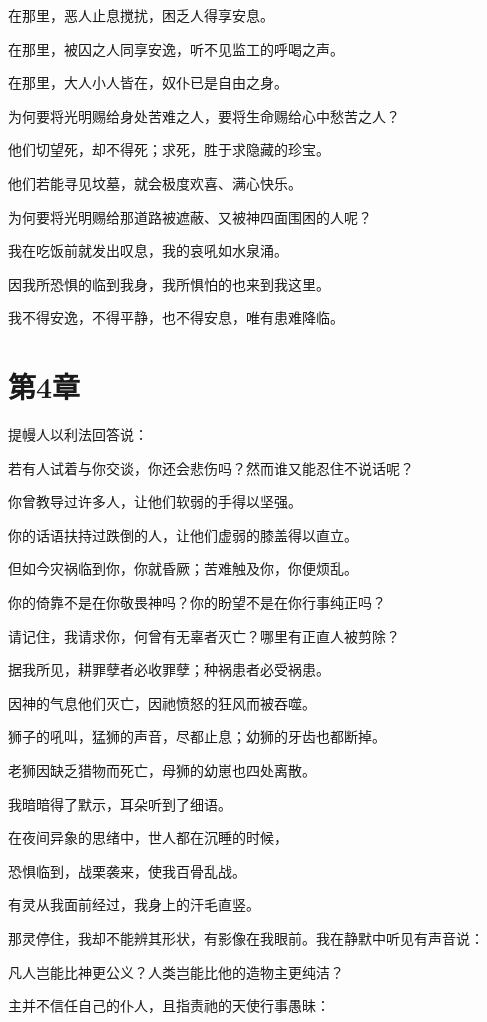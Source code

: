 \documentclass[12pt,oneside]{book}
\begin{document}
在那里，恶人止息搅扰，困乏人得享安息。

在那里，被囚之人同享安逸，听不见监工的呼喝之声。

在那里，大人小人皆在，奴仆已是自由之身。

为何要将光明赐给身处苦难之人，要将生命赐给心中愁苦之人？

他们切望死，却不得死；求死，胜于求隐藏的珍宝。

他们若能寻见坟墓，就会极度欢喜、满心快乐。

为何要将光明赐给那道路被遮蔽、又被神四面围困的人呢？

我在吃饭前就发出叹息，我的哀吼如水泉涌。

因我所恐惧的临到我身，我所惧怕的也来到我这里。

我不得安逸，不得平静，也不得安息，唯有患难降临。


\chapter{第4章}
提幔人以利法回答说：

若有人试着与你交谈，你还会悲伤吗？然而谁又能忍住不说话呢？

你曾教导过许多人，让他们软弱的手得以坚强。

你的话语扶持过跌倒的人，让他们虚弱的膝盖得以直立。

但如今灾祸临到你，你就昏厥；苦难触及你，你便烦乱。

你的倚靠不是在你敬畏神吗？你的盼望不是在你行事纯正吗？

请记住，我请求你，何曾有无辜者灭亡？哪里有正直人被剪除？

据我所见，耕罪孽者必收罪孽；种祸患者必受祸患。

因神的气息他们灭亡，因祂愤怒的狂风而被吞噬。

狮子的吼叫，猛狮的声音，尽都止息；幼狮的牙齿也都断掉。

老狮因缺乏猎物而死亡，母狮的幼崽也四处离散。

我暗暗得了默示，耳朵听到了细语。

在夜间异象的思绪中，世人都在沉睡的时候，

恐惧临到，战栗袭来，使我百骨乱战。

有灵从我面前经过，我身上的汗毛直竖。

那灵停住，我却不能辨其形状，有影像在我眼前。我在静默中听见有声音说：

凡人岂能比神更公义？人类岂能比他的造物主更纯洁？

主并不信任自己的仆人，且指责祂的天使行事愚昧：
\end{document}
